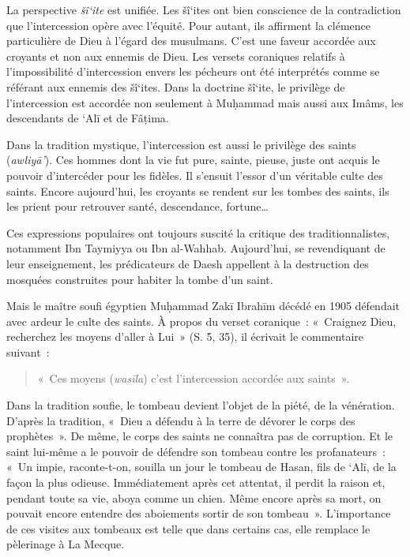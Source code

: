 La perspective \emph{šî`ite} est unifiée. Les šî`ites ont bien
conscience de la contradiction que l'intercession opère avec l'équité.
Pour autant, ils affirment la clémence particulière de Dieu à l'égard
des musulmans. C'est une faveur accordée aux croyants et non aux ennemis
de Dieu. Les versets coraniques relatifs à l'impossibilité
d'intercession envers les pécheurs ont été interprétés comme se référant
aux ennemis des šî`ites. Dans la doctrine šî`ite, le privilège de
l'intercession est accordée non seulement à Muḥammad mais aussi aux
Imâms, les descendants de `Alī et de Fâṭima.

Dans la tradition mystique, l'intercession est aussi le privilège des
saints (\emph{awliyā'}). Ces hommes dont la vie fut pure, sainte,
pieuse, juste ont acquis le pouvoir d'intercéder pour les fidèles. Il
s'ensuit l'essor d'un véritable culte des saints. Encore aujourd'hui,
les croyants se rendent sur les tombes des saints, ils les prient pour
retrouver santé, descendance, fortune\ldots{}


Ces expressions populaires ont toujours suscité la critique des
traditionnalistes, notamment Ibn Taymiyya ou Ibn al-Wahhab. Aujourd'hui,
se revendiquant de leur enseignement, les prédicateurs de Daesh
appellent à la destruction des mosquées construites pour habiter la
tombe d'un saint.


Mais le maître soufi égyptien Muḥammad Zakī Ibrahīm décédé en 1905
défendait avec ardeur le culte des saints. À propos du verset
coranique~: «~Craignez Dieu, recherchez les moyens d'aller à Lui~» (S.
5, 35), il écrivait le commentaire suivant~:
\begin{quote}
    «~Ces moyens
(\emph{wasīla}) c'est l'intercession accordée aux saints~».
\end{quote}
 Dans la
tradition soufie, le tombeau devient l'objet de la piété, de la
vénération. D'après la tradition, «~Dieu a défendu à la terre de dévorer
le corps des prophètes~». De même, le corps des saints ne connaîtra pas
de corruption. Et le saint lui-même a le pouvoir de défendre son tombeau
contre les profanateurs~: «~Un impie, raconte-t-on, souilla un jour le
tombeau de Hasan, fils de `Alī, de la façon la plus odieuse.
Immédiatement après cet attentat, il perdit la raison et, pendant toute
sa vie, aboya comme un chien. Même encore après sa mort, on pouvait
encore entendre des aboiements sortir de son tombeau~». L'importance de ces visites aux tombeaux est
telle que dans certains cas, elle remplace le pèlerinage à La Mecque.


